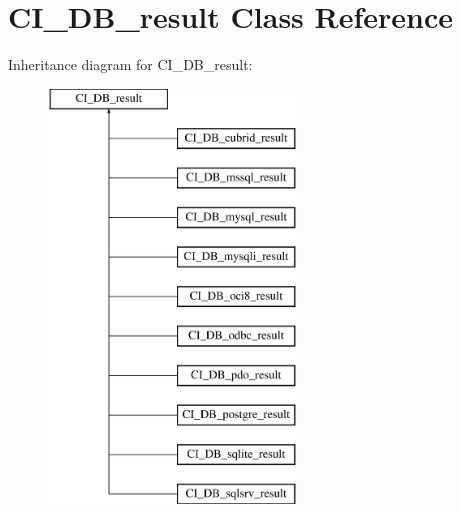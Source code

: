 \section{C\-I\-\_\-\-D\-B\-\_\-result Class Reference}
\label{class_c_i___d_b__result}
Inheritance diagram for C\-I\-\_\-\-D\-B\-\_\-result\-:\begin{figure}[H]
\begin{center}
\leavevmode
\includegraphics[height=11.000000cm]{class_c_i___d_b__result}
\end{center}
\end{figure}
